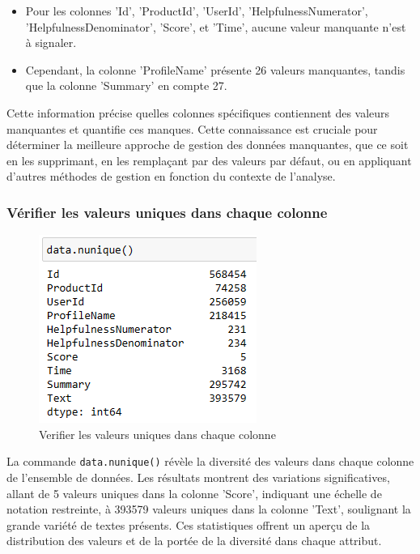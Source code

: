 \begin{itemize}
    \item Pour les colonnes 'Id', 'ProductId', 'UserId', 'HelpfulnessNumerator', 'HelpfulnessDenominator', 'Score', et 'Time', aucune valeur manquante n'est à signaler.
    \item Cependant, la colonne 'ProfileName' présente 26 valeurs manquantes, tandis que la colonne 'Summary' en compte 27.
\end{itemize}

Cette information précise quelles colonnes spécifiques contiennent des valeurs manquantes et quantifie ces manques. Cette connaissance est cruciale pour déterminer la meilleure approche de gestion des données manquantes, que ce soit en les supprimant, en les remplaçant par des valeurs par défaut, ou en appliquant d'autres méthodes de gestion en fonction du contexte de l'analyse.

\subsubsection{Vérifier les valeurs uniques dans chaque colonne}
\begin{figure}[h]
    \centering
    \includegraphics[scale=0.7]{assets/nunique.PNG}
    \caption{Verifier les valeurs uniques dans chaque colonne}
    \label{fig:isnull}
\end{figure}
La commande \texttt{data.nunique()} révèle la diversité des valeurs dans chaque colonne de l'ensemble de données. Les résultats montrent des variations significatives, allant de 5 valeurs uniques dans la colonne 'Score', indiquant une échelle de notation restreinte, à 393579 valeurs uniques dans la colonne 'Text', soulignant la grande variété de textes présents. Ces statistiques offrent un aperçu de la distribution des valeurs et de la portée de la diversité dans chaque attribut.

